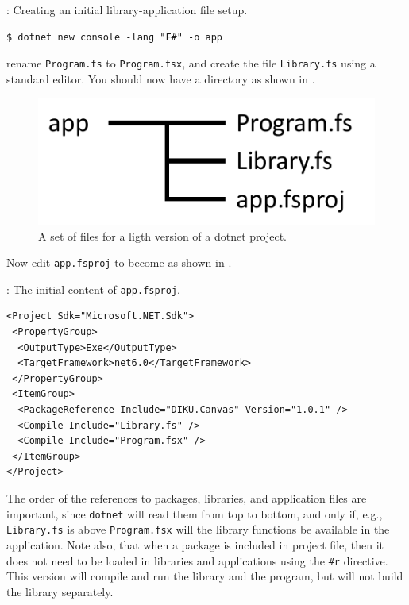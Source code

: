 \documentclass[fsharpNotes.tex]{subfiles}
\begin{document}

\begin{codeNOutput}[label=dotnetNew,
  top=-5pt,
  bottom=-5pt,
  left=-2pt,
  right=-2pt,
]{: Creating an initial library-application file setup.}
  \begin{lstlisting}[language=console,escapechar=§]
$ dotnet new console -lang "F#" -o app
\end{lstlisting}%
\end{codeNOutput}
rename \lstinline[language=console]{Program.fs} to \lstinline[language=console]{Program.fsx}, and create the file \lstinline[language=console]{Library.fs} using a standard editor. You should now have a directory as shown in .
\begin{figure} %
  \centering
  \includegraphics[width=0.35\linewidth]{dotnetLightNew}
  \caption{A set of files for a ligth version of a dotnet project.}
  \label{fig:dotnetNewLightFileSystem}
\end{figure}
Now edit \lstinline[language=console]{app.fsproj} to become as shown in .
\begin{codeNOutput}[label=appLightFsproj,
  top=-5pt,
  bottom=-5pt,
  left=-2pt,
  right=-2pt,
]{: The initial content of \texttt{app.fsproj}.}
  \begin{lstlisting}[language=console,escapechar=§]
<Project Sdk="Microsoft.NET.Sdk">
 <PropertyGroup>
  <OutputType>Exe</OutputType>
  <TargetFramework>net6.0</TargetFramework>
 </PropertyGroup>
 <ItemGroup>
  <PackageReference Include="DIKU.Canvas" Version="1.0.1" />
  <Compile Include="Library.fs" />
  <Compile Include="Program.fsx" />
 </ItemGroup>
</Project>
\end{lstlisting}
\end{codeNOutput}
The order of the references to packages, libraries, and application files are important, since \lstinline[language=console]{dotnet} will read them from top to bottom, and only if, e.g., \lstinline[language=console]{Library.fs} is above \lstinline[language=console]{Program.fsx} will the library functions be available in the application. Note also, that when a package is included in project file, then it does not need to be loaded in libraries and applications using the \lstinline{#r} directive. This version will compile and run the library and the program, but will not build the library separately.
\end{document}
